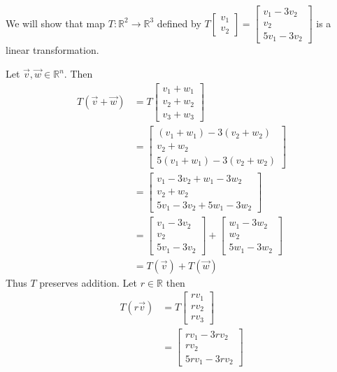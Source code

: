 \begin{example} We will show that  map $T:\mathbb{R}^2 \to \mathbb{R}^3$ 
defined by 
$T\begin{bmatrix}v_1 \\ v_2 \end{bmatrix}=
\begin{bmatrix}v_1-3v_2\\v_2\\5v_1-3v_2\end{bmatrix}$
is a linear transformation.

Let $\vec{v},\vec{w} \in \mathbb{R}^n$. Then 
\begin{align*}
T(\vec{v}+\vec{w}) 
&= T\begin{bmatrix}v_1+w_1\\v_2+w_2\\v_3+w_3\end{bmatrix}\\
&= \begin{bmatrix}(v_1+w_1)-3(v_2+w_2)\\v_2+w_2\\5(v_1+w_1)-3(v_2+w_2)\end{bmatrix}\\
&= \begin{bmatrix}v_1-3v_2+w_1-3w_2\\v_2+w_2\\5v_1-3v_2+5w_1-3w_2\end{bmatrix}\\
&= \begin{bmatrix}v_1-3v_2\\v_2\\5v_1-3v_2\end{bmatrix}
+\begin{bmatrix}w_1-3w_2\\w_2\\5w_1-3w_2\end{bmatrix}\\
&= T(\vec{v})+T(\vec{w})
\end{align*}
Thus $T$ preserves addition. Let $r\in \mathbb{R}$ then 
\begin{align*}
T(r\vec{v}) 
&= T\begin{bmatrix}rv_1\\rv_2\\rv_3\end{bmatrix}\\
&= \begin{bmatrix}rv_1-3rv_2\\rv_2\\5rv_1-3rv_2\end{bmatrix}\\

\end{align*}
\end{example}

